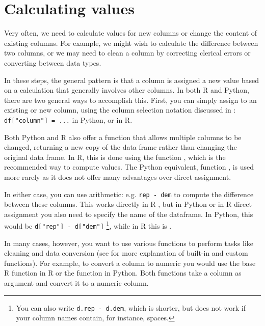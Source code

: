 \section{Calculating values}
\label{sec:calculate}

Very often, we need to calculate values for new columns or change the content of existing columns.
For example, we might wish to calculate the difference between two columns,
or we may need to clean a column by correcting clerical errors or converting between data types.

In these steps, the general pattern is that a column is assigned a new value based on
a calculation that generally involves other columns.
In both R and Python, there are two general ways to accomplish this.
First, you can simply assign to an existing or new column,
using the column selection notation discussed in :
\verb+df["column"] = ...+ in Python, or  in R.

Both Python and R also offer a function that allows multiple columns to be changed,
returning a new copy of the data frame rather than changing the original data frame.
In R, this is done using the  function , which is the recommended way to compute values.
The Python equivalent,  function , is used more rarely as it does not offer many advantages over direct assignment.

In either case, you can use arithmetic: e.g. \verb|rep - dem| to compute the difference between these columns.
This works directly in R ,
but in Python or in R direct assignment you also need to specify the name of the dataframe.
In Python, this would be \verb+d["rep"] - d["dem"]+ \footnote{You can also write \texttt{d.rep - d.dem}, which is shorter, but does not work if your column names contain, for instance, spaces.},
while in R this is . 

In many cases, however, you want to use various functions to perform tasks like cleaning and data conversion
(see  for more explanation of built-in and custom functions).
For example, to convert a column to numeric you would use the base R function  in R or the  function  in Python.
Both functions take a column as argument and convert it to a numeric column.

